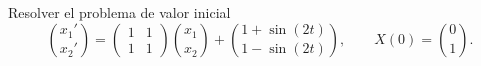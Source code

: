 Resolver el problema de valor inicial
\[\binom{x_1'}{x_2'}=\begin{pmatrix}1&1\\1&1\end{pmatrix}\binom{x_1}{x_2}
+\binom{1+\sin(2t)}{1-\sin(2t)},\qquad X(0)=\binom01.\]
